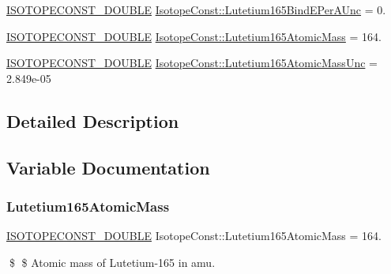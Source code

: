\begin{DoxyCompactItemize}
\mbox{\hyperlink{group___isotope_const-_macros_ga8f45a7272ce02c0b4c65c44636ed719a}{I\+S\+O\+T\+O\+P\+E\+C\+O\+N\+S\+T\+\_\+\+D\+O\+U\+B\+LE}} \mbox{\hyperlink{group___isotope_const-_lutetium-_lu165_ga44fe50e9b0806d6dcbbe2a97f3c11a2e}{Isotope\+Const\+::\+Lutetium165\+Bind\+E\+Per\+A\+Unc}} = 0.
\item 
\mbox{\hyperlink{group___isotope_const-_macros_ga8f45a7272ce02c0b4c65c44636ed719a}{I\+S\+O\+T\+O\+P\+E\+C\+O\+N\+S\+T\+\_\+\+D\+O\+U\+B\+LE}} \mbox{\hyperlink{group___isotope_const-_lutetium-_lu165_ga7214b3e596b31f8915194a2eecdbdda0}{Isotope\+Const\+::\+Lutetium165\+Atomic\+Mass}} = 164.
\item 
\mbox{\hyperlink{group___isotope_const-_macros_ga8f45a7272ce02c0b4c65c44636ed719a}{I\+S\+O\+T\+O\+P\+E\+C\+O\+N\+S\+T\+\_\+\+D\+O\+U\+B\+LE}} \mbox{\hyperlink{group___isotope_const-_lutetium-_lu165_gab936a4b55b0474d15490b109dc04c2e1}{Isotope\+Const\+::\+Lutetium165\+Atomic\+Mass\+Unc}} = 2.\+849e-\/05
\end{DoxyCompactItemize}


\subsection{Detailed Description}


\subsection{Variable Documentation}
\mbox{\label{group___isotope_const-_lutetium-_lu165_ga7214b3e596b31f8915194a2eecdbdda0}} 
\subsubsection{\texorpdfstring{Lutetium165\+Atomic\+Mass}{Lutetium165AtomicMass}}
{\footnotesize\ttfamily \mbox{\hyperlink{group___isotope_const-_macros_ga8f45a7272ce02c0b4c65c44636ed719a}{I\+S\+O\+T\+O\+P\+E\+C\+O\+N\+S\+T\+\_\+\+D\+O\+U\+B\+LE}} Isotope\+Const\+::\+Lutetium165\+Atomic\+Mass = 164.}

\$ \$ Atomic mass of Lutetium-\/165 in amu. \mbox{\label{group___isotope_const-_lutetium-_lu165_gab936a4b55b0474d15490b109dc04c2e1}} 
